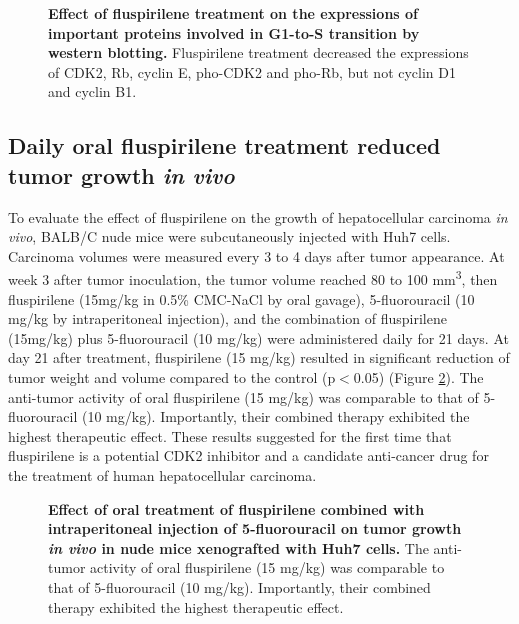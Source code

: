 \documentclass[10pt,letterpaper]{article}
\begin{document}
\begin{figure}
\caption{{\bf Effect of fluspirilene treatment on the expressions of important proteins involved in G1-to-S transition by western blotting.} Fluspirilene treatment decreased the expressions of CDK2, Rb, cyclin E, pho-CDK2 and pho-Rb, but not cyclin D1 and cyclin B1.}
\label{WesternBlot}
\end{figure}

\subsection*{Daily oral fluspirilene treatment reduced tumor growth \textit{in vivo}}

To evaluate the effect of fluspirilene on the growth of hepatocellular carcinoma \textit{in vivo}, BALB/C nude mice were subcutaneously injected with Huh7 cells. Carcinoma volumes were measured every 3 to 4 days after tumor appearance. At week 3 after tumor inoculation, the tumor volume reached 80 to 100 mm\textsuperscript{3}, then fluspirilene (15mg/kg in 0.5\% CMC-NaCl by oral gavage), 5-fluorouracil (10 mg/kg by intraperitoneal injection), and the combination of fluspirilene (15mg/kg) plus 5-fluorouracil (10 mg/kg) were administered daily for 21 days. At day 21 after treatment, fluspirilene (15 mg/kg) resulted in significant reduction of tumor weight and volume compared to the control (p$<$0.05) (Figure \ref{FluspirileneFluorouracilOnTumorGrowth}). The anti-tumor activity of oral fluspirilene (15 mg/kg) was comparable to that of 5-fluorouracil (10 mg/kg). Importantly, their combined therapy exhibited the highest therapeutic effect. These results suggested for the first time that fluspirilene is a potential CDK2 inhibitor and a candidate anti-cancer drug for the treatment of human hepatocellular carcinoma.

\begin{figure}
\caption{{\bf Effect of oral treatment of fluspirilene combined with intraperitoneal injection of 5-fluorouracil on tumor growth \textit{in vivo} in nude mice xenografted with Huh7 cells.} The anti-tumor activity of oral fluspirilene (15 mg/kg) was comparable to that of 5-fluorouracil (10 mg/kg). Importantly, their combined therapy exhibited the highest therapeutic effect.}
\label{FluspirileneFluorouracilOnTumorGrowth}
\end{figure}
\end{document}
